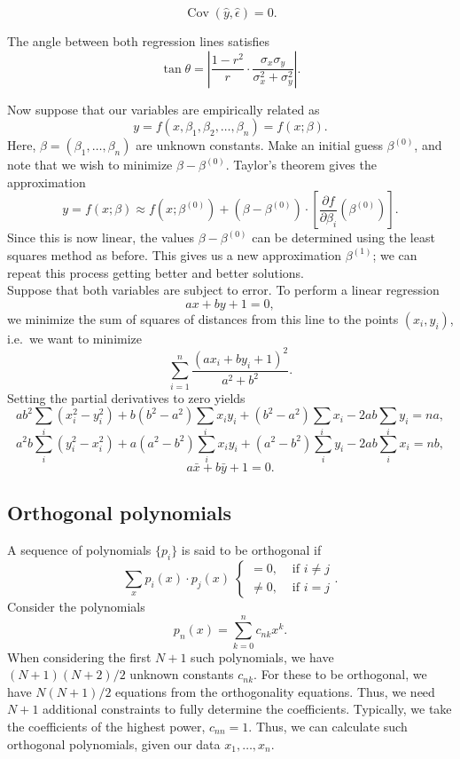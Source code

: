 \documentclass[11pt]{article}
\DeclareMathOperator{\cov}{Cov}
\theoremstyle{definition}
\theoremstyle{remark}
\numberwithin{equation}{section}
\begin{document}
    \begin{lemma}
        \[
            \cov(\hat{y}, \hat{\epsilon}) = 0.  
        \]
    \end{lemma}

    \begin{lemma}
        The angle between both regression lines satisfies \[
            \tan\theta = \left|\frac{1 - r^2}{r} \cdot
            \frac{\sigma_x\sigma_y}{\sigma_x^2 + \sigma_y^2}\right|.
        \] 
    \end{lemma}


    Now suppose that our variables are empirically related as \[
        y = f(x, \beta_1, \beta_2, \dots, \beta_n) = f(x; \beta).
    \] Here, $\beta = (\beta_1, \dots, \beta_n)$ are unknown constants. Make an
    initial guess $\beta^{(0)}$, and note that we wish to minimize $\beta -
    \beta^{(0)}$. Taylor's theorem gives the approximation \[
        y = f(x; \beta) \approx f(x; \beta^{(0)}) + (\beta - \beta^{(0)})\cdot
        \left[\frac{\partial f}{\partial \beta_i}(\beta^{(0)})\right].
    \] Since this is now linear, the values $\beta - \beta^{(0)}$ can be determined
    using the least squares method as before. This gives us a new approximation
    $\beta^{(1)}$; we can repeat this process getting better and better solutions. \\


    Suppose that both variables are subject to error. To perform a linear regression
    \[
        ax + by + 1 = 0,
    \] we minimize the sum of squares of distances from this line to the points
    $(x_i, y_i)$, i.e.\ we want to minimize \[
        \sum_{i = 1}^n \frac{(ax_i + by_i + 1)^2}{a^2 + b^2}.
    \] Setting the partial derivatives to zero yields \[
        ab^2\sum_i (x_i^2 - y_i^2) + b(b^2 - a^2)\sum_i x_iy_i + (b^2 - a^2)\sum_ix_i
        - 2ab\sum_i y_i = na,
    \] \[
        a^2b\sum_i (y_i^2 - x_i^2) + a(a^2 - b^2)\sum_i x_iy_i + (a^2 - b^2)\sum_iy_i
        - 2ab\sum_i x_i = nb,
    \] \[
        a\bar{x} + b\bar{y} + 1 = 0.
    \] 

    
    \subsection{Orthogonal polynomials}
    
    A sequence of polynomials $\{p_i\}$ is said to be orthogonal if \[
        \sum_x p_i(x)\cdot p_j(x) \;\begin{cases}
            = 0, &\text{ if } i \neq j \\
            \neq 0, &\text{ if } i = j
        \end{cases}.
    \] Consider the polynomials \[
        p_n(x) = \sum_{k = 0}^n c_{nk}x^k.
    \] When considering the first $N + 1$ such polynomials, we have $(N + 1)(N + 2) /
    2$ unknown constants $c_{nk}$. For these to be orthogonal, we have $N(N + 1) / 2$
    equations from the orthogonality equations. Thus, we need $N + 1$ additional
    constraints to fully determine the coefficients. Typically, we take the
    coefficients of the highest power, $c_{nn} = 1$. Thus, we can calculate such
    orthogonal polynomials, given our data $x_1, \dots, x_n$.
\end{document}
